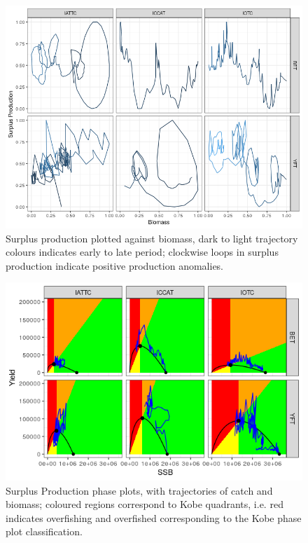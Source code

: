 \documentclass[12pt,doublespacing,a4paper]{ouparticle}
\begin{document}
\newpage
\begin{figure}[h]
\centering
\includegraphics[width=\textwidth]{pe-sp2-1.png}
\caption{Surplus production plotted against biomass, dark to light trajectory colours indicates early to late period; clockwise loops in surplus production indicate positive production anomalies.}
\label{fig:sp}
\end{figure}


\newpage
\begin{figure}[h]
\centering
\includegraphics[width=\textwidth]{pe-pf2-1.png}
\caption{Surplus Production phase plots, with trajectories of catch and biomass; coloured regions correspond to Kobe quadrants, i.e. red indicates overfishing and overfished corresponding to the Kobe phase plot classification.}
\label{fig:pf}
\end{figure}
\end{document}
